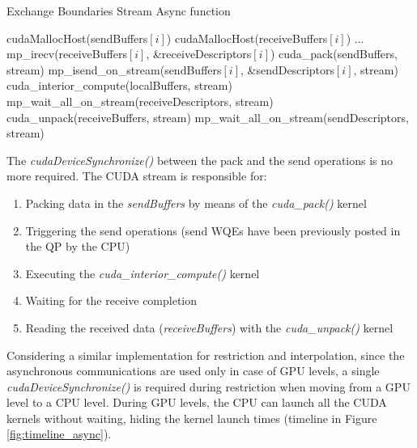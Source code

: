 \documentclass[review]{siamart1116}
\begin{document}
\begin{algorithm}
\small
\caption{Exchange Boundaries Stream Async function}
\label{algo:exchange_boundaries_async}
\begin{algorithmic}[1]
\State cudaMallocHost(sendBuffers$[i]$)
\State cudaMallocHost(receiveBuffers$[i]$)
\EndFor
\State ...
 \label{alg:a}
                \State mp\_irecv(receiveBuffers$[i]$, \&receiveDescriptors$[i]$)
        \EndFor
        \State cuda\_pack(sendBuffers, stream)
                \State mp\_isend\_on\_stream(sendBuffers$[i]$, \&sendDescriptors$[i]$, stream)
        \EndFor
        \State cuda\_interior\_compute(localBuffers, stream)
        \State mp\_wait\_all\_on\_stream(receiveDescriptors, stream)
        \State cuda\_unpack(receiveBuffers, stream)
        \State mp\_wait\_all\_on\_stream(sendDescriptors, stream)
\EndFunction
\end{algorithmic}
\end{algorithm}

The \textit{cudaDeviceSynchronize()} between the pack and the send operations is no more required. The CUDA stream is responsible for:

\begin{enumerate}
\item Packing data in the \textit{sendBuffers} by means of the \textit{cuda\_pack()} kernel
\item Triggering the send operations (send WQEs have been previously posted in the QP by the CPU)
\item Executing the \textit{cuda\_interior\_compute()} kernel
\item Waiting for the receive completion
\item Reading the received data (\textit{receiveBuffers}) with the \textit{cuda\_unpack()} kernel
\end{enumerate}

Considering a similar implementation for restriction and interpolation, since the asynchronous communications are used only in case of GPU levels, a single \textit{cudaDeviceSynchronize()} is required during restriction when moving from a GPU level to a CPU level. During GPU levels, the CPU can launch all the CUDA kernels without waiting, hiding the kernel launch times (timeline in Figure \ref{fig:timeline_async}).
\end{document}
